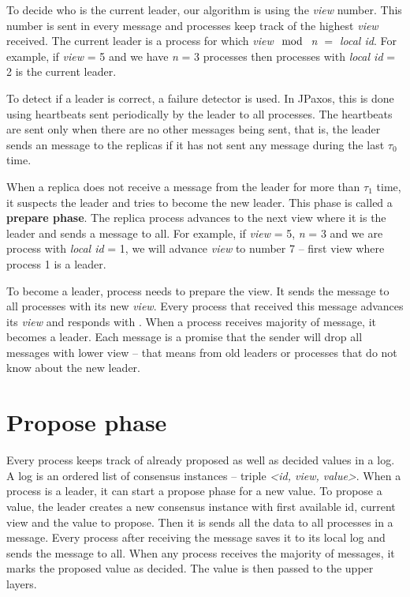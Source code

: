 To decide who is the current leader, our algorithm is using the \textit{view} number. This number is sent in every message and processes keep track of the highest \textit{view} received. The current leader is a process for which \textit{view $\mod$ n $=$ local id}. For example, if \textit{view} = 5 and we have \textit{n} = 3 processes then processes with \textit{local id} = 2 is the current leader.

To detect if a leader is correct, a failure detector is used. In JPaxos, this is done using heartbeats sent periodically by the leader to all processes. The heartbeats are sent only when there are no other messages being sent, that is, the leader sends an \alive message to the replicas if it has not sent any message during the last $\tau_0$ time.

\begin{TODO} %
When a replica does not receive a message from the leader for more than $\tau_1$ time, it suspects the leader and tries to become the new leader. This phase is called a \textbf{prepare phase}. The replica process advances to the next view where it is the leader and sends a \prepare message to all. For example, if \textit{view} = 5, \textit{n} = 3 and we are process with \textit{local id} = 1, we will advance \textit{view} to number 7 -- first view where process 1 is a leader.

To become a leader, process needs to prepare the view. It sends the \prepare message to all processes with its new \textit{view}. Every process that received this message advances its \textit{view} and responds with \prepareOK[]. When a process receives majority of \prepareOK message, it becomes a leader. Each \prepareOK message is a promise that the sender will drop all messages with lower view -- that means from old leaders or processes that do not know about the new leader.
\end{TODO}


\section{Propose phase} 

Every process keeps track of already proposed as well as decided values in a log. A log is an ordered list of consensus instances -- triple \textit{<id, view, value>}. When a process is a leader, it can start a propose phase for a new value. To propose a value, the leader creates a new consensus instance with first available id, current view and the value to propose. Then it is sends all the data to all processes in a \propose message. Every process after receiving the \propose message saves it to its local log and sends the \accept message to all. When any process receives the majority of \accept messages, it marks the proposed value as decided. The value is then passed to the upper layers.

